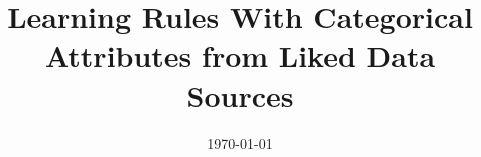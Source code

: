 \documentclass[a4paper, 11pt, twoside, openright]{Thesis}  %
\begin{document}
\frontmatter	  %

\title  {Learning Rules With Categorical Attributes from Liked Data Sources}
\author{\authornames}
\addresses  {\groupname\\\deptname\\\univname}  %
\date       {\today}
\subject    {}
\keywords   {}

\maketitle



\pagestyle{fancy}  %
\fancyhead[RE,LO]{\sffamily\bfseries\nouppercase{\rightmark}}
\fancyhead[LE,RO]{\thepage}

\pagestyle{empty}  %



\pagestyle{empty}


\pagestyle{empty}


\pagestyle{fancy}  %
\end{document}
